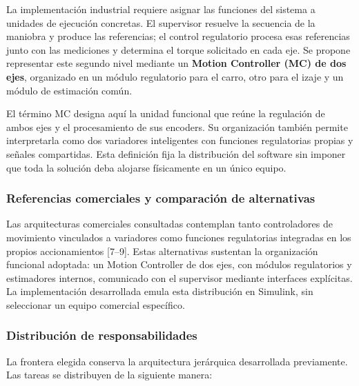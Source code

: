 \documentclass[a4paper,10pt,onecolumn,journal]{ieeeconf}
\numberwithin{equation}{section}
\begin{document}
La implementación industrial requiere asignar las funciones del sistema a unidades de ejecución concretas. El supervisor resuelve la secuencia de la maniobra y produce las referencias; el control regulatorio procesa esas referencias junto con las mediciones y determina el torque solicitado en cada eje. Se propone representar este segundo nivel mediante un \textbf{Motion Controller (MC) de dos ejes}, organizado en un módulo regulatorio para el carro, otro para el izaje y un módulo de estimación común.

El término MC designa aquí la unidad funcional que reúne la regulación de ambos ejes y el procesamiento de sus encoders. Su organización también permite interpretarla como dos variadores inteligentes con funciones regulatorias propias y señales compartidas. Esta definición fija la distribución del software sin imponer que toda la solución deba alojarse físicamente en un único equipo.


\subsubsection{Referencias comerciales y comparación de alternativas}

Las arquitecturas comerciales consultadas contemplan tanto controladores de movimiento vinculados a variadores como funciones regulatorias integradas en los propios accionamientos [7--9]. Estas alternativas sustentan la organización funcional adoptada: un Motion Controller de dos ejes, con módulos regulatorios y estimadores internos, comunicado con el supervisor mediante interfaces explícitas. La implementación desarrollada emula esta distribución en Simulink, sin seleccionar un equipo comercial específico.

\subsubsection{Distribución de responsabilidades}

La frontera elegida conserva la arquitectura jerárquica desarrollada previamente. Las tareas se distribuyen de la siguiente manera:
\end{document}
